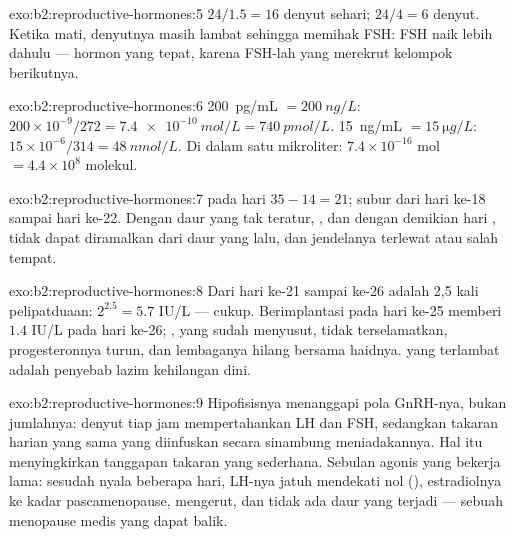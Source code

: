 \begin{solution}{exo:b2:reproductive-hormones:5}
$24/1.5 = 16$ denyut sehari; $24/4 = 6$ denyut. Ketika 
mati, denyutnya masih lambat sehingga memihak FSH: FSH naik lebih
dahulu --- hormon yang tepat, karena FSH-lah yang merekrut kelompok
 berikutnya.
\end{solution}

\begin{solution}{exo:b2:reproductive-hormones:6}
\qty{200}{pg/mL} $= \qty{200}{ng/L}$: $200\times 10^{-9}/272 =
\qty{7.4e-10}{mol/L} = \qty{740}{pmol/L}$. \qty{15}{ng/mL} $=
\qty{15}{\micro g/L}$: $15\times 10^{-6}/314 = \qty{48}{nmol/L}$. Di
dalam satu mikroliter: $7.4\times 10^{-16}$ mol $= 4.4\times 10^{8}$
molekul.
\end{solution}

\begin{solution}{exo:b2:reproductive-hormones:7}
 pada hari $35 - 14 = 21$; subur dari hari ke-18 sampai hari
ke-22. Dengan daur yang tak teratur, , dan dengan
demikian hari , tidak dapat diramalkan dari daur yang lalu,
dan jendelanya terlewat atau salah tempat.
\end{solution}

\begin{solution}{exo:b2:reproductive-hormones:8}
Dari hari ke-21 sampai ke-26 adalah 2,5 kali pelipatduaan:
$2^{2.5} = 5.7$ IU/L --- cukup. Berimplantasi pada hari ke-25 memberi
$1.4$ IU/L pada hari ke-26; , yang sudah menyusut,
tidak terselamatkan, progesteronnya turun, dan lembaganya hilang
bersama haidnya.  yang terlambat adalah penyebab lazim
kehilangan dini.
\end{solution}

\begin{solution}{exo:b2:reproductive-hormones:9}
Hipofisisnya menanggapi pola GnRH-nya, bukan jumlahnya: denyut tiap jam
mempertahankan LH dan FSH, sedangkan takaran harian yang sama yang
diinfuskan secara sinambung meniadakannya. Hal itu menyingkirkan
tanggapan takaran yang sederhana. Sebulan agonis yang bekerja lama:
sesudah nyala beberapa hari, LH-nya jatuh mendekati nol (), estradiolnya ke kadar pascamenopause, 
mengerut, dan tidak ada daur yang terjadi --- sebuah menopause medis
yang dapat balik.
\end{solution}

